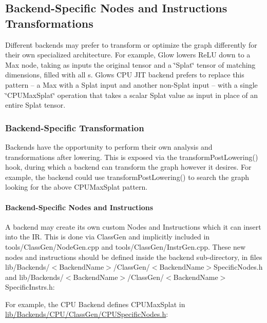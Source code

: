 \subsection*{Backend-\/\+Specific Nodes and Instructions Transformations}

Different backends may prefer to transform or optimize the graph differently for their own specialized architecture. For example, Glow lowers Re\+LU down to a Max node, taking as inputs the original tensor and a \char`\"{}\+Splat\char`\"{} tensor of matching dimensions, filled with all {}s. Glow\textquotesingle{}s C\+PU J\+IT backend prefers to replace this pattern -- a Max with a Splat input and another non-\/\+Splat input -- with a single \char`\"{}\+C\+P\+U\+Max\+Splat\char`\"{} operation that takes a scalar Splat value as input in place of an entire Splat tensor.

\subsubsection*{Backend-\/\+Specific Transformation}

Backends have the opportunity to perform their own analysis and transformations after lowering. This is exposed via the {\ttfamily transform\+Post\+Lowering()} hook, during which a backend can transform the graph however it desires. For example, the backend could use {\ttfamily transform\+Post\+Lowering()} to search the graph looking for the above {\ttfamily C\+P\+U\+Max\+Splat} pattern.

\paragraph*{Backend-\/\+Specific Nodes and Instructions}

A backend may create its own custom Nodes and Instructions which it can insert into the IR. This is done via Class\+Gen and implicitly included in {\ttfamily tools/\+Class\+Gen/\+Node\+Gen.\+cpp} and {\ttfamily tools/\+Class\+Gen/\+Instr\+Gen.\+cpp}. These new nodes and instructions should be defined inside the backend sub-\/directory, in files {\ttfamily lib/\+Backends/$<$Backend\+Name$>$/\+Class\+Gen/$<$Backend\+Name$>$Specific\+Nodes.\+h} and {\ttfamily lib/\+Backends/$<$Backend\+Name$>$/\+Class\+Gen/$<$Backend\+Name$>$Specific\+Instrs.\+h}\+:

For example, the C\+PU Backend defines {\ttfamily C\+P\+U\+Max\+Splat} in {\ttfamily \hyperlink{_c_p_u_specific_nodes_8h_source}{lib/\+Backends/\+C\+P\+U/\+Class\+Gen/\+C\+P\+U\+Specific\+Nodes.\+h}}\+:


